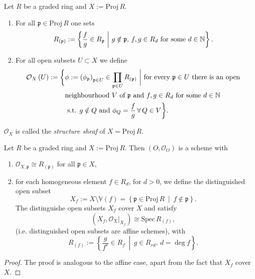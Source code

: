\begin{defn}
	Let $R$ be a graded ring and $X := \mathrm{Proj}\, R$.
	\begin{enumerate}
		\item For all $\mathfrak{p} \in \mathrm{Proj}\, R$ one sets
			\begin{equation}
				R_{(\mathfrak{p})} :=
				\left\{ \frac{f}{g} \in R_{\mathfrak{p}} \ \middle|\ 
				g \notin \mathfrak{p},\, f,g \in R_d 
			\text{ for some } d \in \N \right\}
			.\end{equation} 
		\item For all open subsets $U \subset X$ we define
			\begin{align*}
				\mathcal{O}_{X} \left( U \right) := \bigg\{ &
			\phi := \left( \phi_{\mathfrak{p}} \right)_{\mathfrak{p} \in U} \in 
		\prod_{\mathfrak{p} \in U} R_{(\mathfrak{p})} \ \bigg|\ 
	\text{for every } \mathfrak{p} \in U \text{ there is an open}\\
	&\text{neighbourhood } V \text{ of } \mathfrak{p} \text{ and } f,g \in R_d \text{ for some } d \in \N\\
	&\text{ s.t. } g \notin Q \text{ and } \phi_Q = \frac{f}{g} \,\forall\, Q \in V \bigg\}
			.\end{align*} 
	\end{enumerate}
	$\mathcal{O}_X$ is called the {\em structure sheaf} of $X = \mathrm{Proj}\, R$.
\end{defn}

\begin{prop}
	Let $R$ be a graded ring and $X := \mathrm{Proj}\, R$.
	Then $\left( O, \mathcal{O}_{ O } \right)$ is a scheme with
	\begin{enumerate}
		\item $\mathcal{O}_{X, \mathfrak{p}} \cong R_{(\mathfrak{p})}$
			for all $\mathfrak{p} \in X$,
		\item for each homogeneous element $f \in R_d$, for $d > 0$,
			we define the distinguished open subset
			\begin{equation}
			X_f := X \setminus \mathbb{V}\left( f \right) =
			\left\{ \mathfrak{p} \in \mathrm{Proj}\, R \ \middle|\ f \notin \mathfrak{p} \right\}
			.\end{equation} 
			The distinguishe open subsets $X_f$ cover $X$ and satisfy
			\begin{equation}
			\left( X_f, \left.\mathcal{O}_{ X }\right|_{X_f} \right) \cong
				\mathrm{Spec}\, R_{(f)}
			,\end{equation} 
			(i.e. distinguished open subsets are affine schemes),
			with
			\begin{equation}
				R_{(f)} := \left\{ 
				\frac{g}{f^r} \in R_f \ \middle|\ g \in R_{rd},\, d = \deg f \right\}
			.\end{equation} 
	\end{enumerate}
\end{prop}
\begin{proof}
	The proof is analogous to the affine case, apart
	from the fact that $X_f$ cover $X$.
\end{proof}


